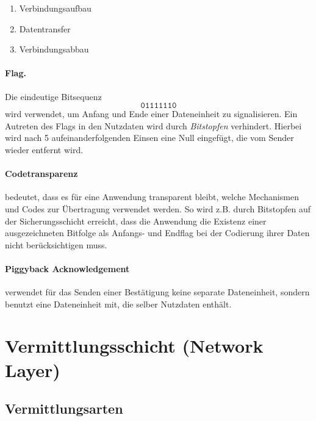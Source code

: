 \documentclass[]{scrartcl}
\begin{document}
\begin{enumerate}
\item Verbindungsaufbau
\item Datentransfer
\item Verbindungsabbau
\end{enumerate}

\paragraph{Flag. } Die eindeutige Bitsequenz
$$ \mathtt{01111110}$$
 wird verwendet, um Anfang und Ende einer Dateneinheit zu signalisieren. Ein Autreten des Flags in den Nutzdaten wird durch \emph{Bitstopfen} verhindert. Hierbei wird nach 5 aufeinanderfolgenden Einsen eine Null eingef\"ugt, die vom Sender wieder entfernt wird.


\paragraph{Codetransparenz } bedeutet, dass es f\"ur eine Anwendung transparent bleibt, welche Mechanismen und Codes zur \"Ubertragung verwendet werden. So wird z.B. durch Bitstopfen auf der Sicherungsschicht erreicht, dass die Anwendung die Existenz einer ausgezeichneten Bitfolge als  Anfangs- und Endflag bei der Codierung ihrer Daten nicht ber\"ucksichtigen muss.

\paragraph{Piggyback Acknowledgement} verwendet f\"ur das Senden einer Best\"atigung keine separate Dateneinheit, sondern benutzt eine Dateneinheit mit, die selber Nutzdaten enth\"alt.



\section{Vermittlungsschicht (Network Layer)}


\subsection{Vermittlungsarten}
\end{document}
